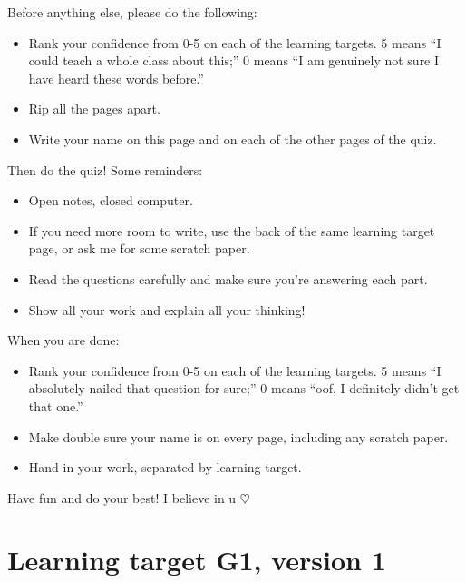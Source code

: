 Before anything else, please do the following:
\begin{itemize}
    \item Rank your confidence from 0-5 on each of the learning targets. 5 means ``I could teach a whole class about this;'' 0 means ``I am genuinely not sure I have heard these words before.''
    \item Rip all the pages apart.
    \item Write your name on this page and on each of the other pages of the quiz.
\end{itemize}

Then do the quiz! Some reminders:
\begin{itemize}
    \item Open notes, closed computer.
    \item If you need more room to write, use the back of the same learning target page, or ask me for some scratch paper.
    \item Read the questions carefully and make sure you're answering each part.
    \item Show all your work and explain all your thinking!
\end{itemize}

When you are done:
\begin{itemize}
    \item Rank your confidence from 0-5 on each of the learning targets. 5 means ``I absolutely nailed that question for sure;'' 0 means ``oof, I definitely didn't get that one.''
    \item Make double sure your name is on every page, including any scratch paper.
    \item Hand in your work, separated by learning target.
\end{itemize}

Have fun and do your best! I believe in u $\heartsuit$

\pagebreak
\section{Learning target G1, version 1}

